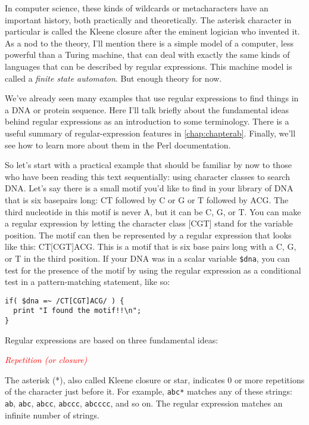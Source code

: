 In computer science, these kinds of wildcards or metacharacters have an important history, both practically and theoretically. The asterisk character in particular is called the Kleene closure after the eminent logician who invented it. As a nod to the theory, I'll mention there is a simple model of a computer, less powerful than a Turing machine, that can deal with exactly the same kinds of languages that can be described by regular expressions. This machine model is called a \textit{finite state automaton}. But enough theory for now. 

We've already seen many examples that use regular expressions to find things in a DNA or protein sequence. Here I'll talk briefly about the fundamental ideas behind regular expressions as an introduction to some terminology. There is a useful summary of regular-expression features in \autoref{chap:chapterab}. Finally, we'll see how to learn more about them in the Perl documentation.

So let's start with a practical example that should be familiar by now to those who have been reading this text sequentially: using character classes to search DNA. Let's say there is a small motif you'd like to find in your library of DNA that is six basepairs long: CT followed by C or G or T followed by ACG. The third nucleotide in this motif is never A, but it can be C, G, or T. You can make a regular expression by letting the character class [CGT] stand for the variable position. The motif can then be represented by a regular expression that looks like this: CT[CGT]ACG. This is a motif that is six base pairs long with a C, G, or T in the third position. If your DNA was in a scalar variable \verb|$dna|, you can test for the presence of the motif by using the regular expression as a conditional test in a pattern-matching statement, like so:

\begin{lstlisting}
if( $dna =~ /CT[CGT]ACG/ ) {
  print "I found the motif!!\n";
}
\end{lstlisting}

Regular expressions are based on three fundamental ideas:

\textcolor{red}{\textit{Repetition (or closure)}}
\begin{adjustwidth}{1cm}{}
The asterisk (*), also called Kleene closure or star, indicates 0 or more repetitions of the character just before it. For example, \verb|abc*| matches any of these strings: \verb|ab|, \verb|abc|, \verb|abcc|, \verb|abccc|, \verb|abcccc|, and so on. The regular expression matches an infinite number of strings. 
\end{adjustwidth}

